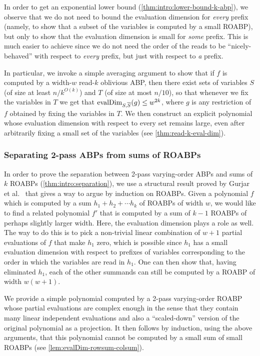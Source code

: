 \documentclass[11pt]{article}
\begin{document}
In order to get an exponential lower bound (\autoref{thm:intro:lower-bound-k-abp}), we observe that we do not need to bound the evaluation dimension for {\em every} prefix (namely, to show that a subset of the variables is computed by a small ROABP), but only to show that the evaluation dimension is small for {\em some} prefix.
This is much easier to achieve since we do not need the order of the reads to be ``nicely-behaved'' with respect to {\em every} prefix, but just with respect to {\em a} prefix.

In particular, we invoke a simple averaging argument to show that if $f$ is computed by a width-$w$ read-$k$ oblivious ABP, then there exist sets of variables $S$ (of size at least $n/k^{O(k)}$) and $T$ (of size at most $n/10$), so that whenever we fix the variables in $T$ we get that $\operatorname{evalDim}_{S, \overline{S}} (g) \le w^{2k}$, where $g$ is any restriction of $f$ obtained by fixing the variables in $T$.
We then construct an explicit polynomial whose evaluation dimension with respect to every set remains large, even after arbitrarily fixing a small set of the variables (see \autoref{thm:read-k-eval-dim}).

\subsubsection{Separating 2-pass ABPs from sums of ROABPs}

In order to prove the separation between 2-pass varying-order ABPs and sums of $k$ ROABPs (\autoref{thm:intro:separation}),
we use a structural result proved by Gurjar et al.\ \cite{GKST15} that gives a way to argue by induction on ROABPs. Given a polynomial $f$ which is computed by a sum $h_1 + h_2 + \cdots h_k$ of ROABPs of width $w$, we would like to find a related polynomial $f'$ that is computed by a sum of $k-1$ ROABPs of perhaps slightly larger width. Here, the evaluation dimension plays a role as well. The way to do this is to pick a non-trivial linear combination of $w+1$ partial evaluations of $f$ that make $h_1$ zero, which is possible since $h_1$ has a small evaluation dimension with respect to prefixes of variables corresponding to the order in which the variables are read in $h_1$. One can then show that, having eliminated $h_1$, each of the other summands can still be computed by a ROABP of width $w(w+1)$.

We provide a simple polynomial computed by a 2-pass varying-order ROABP whose partial evaluations are complex enough in the sense that they contain many linear independent evaluations and also a ``scaled-down'' version of the original polynomial as a projection.
It then follows by induction, using the above arguments, that this polynomial cannot be computed by a small sum of small ROABPs (see \autoref{lem:evalDim-rowsum-colsum}).
\end{document}
